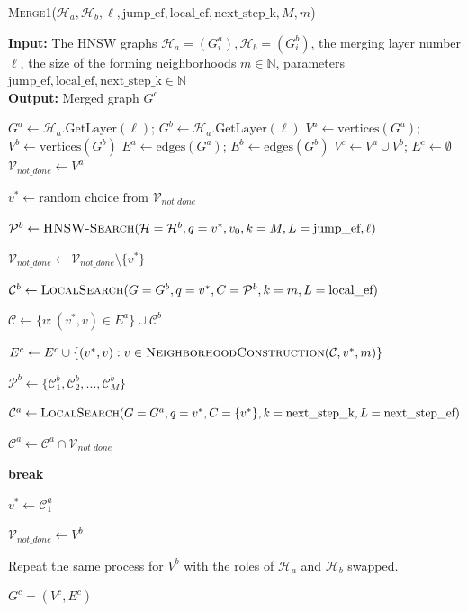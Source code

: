 \documentclass{article}
\begin{document}
\begin{algorithm}
\caption{\textsc{Merge1}($\mathcal{H}_a, \mathcal{H}_b, \ell, \text{jump\_ef}, \text{local\_ef}, \text{next\_step\_k}, M, m$)}\label{alg:merge1}
\textbf{Input:} The HNSW graphs $\mathcal{H}_a = (G^a_i), \mathcal{H}_b = (G^b_i)$, the merging layer number $\ell$, the size of the forming neighborhoods $m \in \mathbb{N}$, parameters $\text{jump\_ef}, \text{local\_ef}, \text{next\_step\_k} \in \mathbb{N}$ \\
\textbf{Output:}  Merged graph $G^c$ 
\begin{algorithmic}[1]
\State $G^a \gets \mathcal{H}_a\text{.GetLayer}(\ell) $; $G^b \gets\mathcal{H}_a\text{.GetLayer}(\ell)$ 
\State $V^a \gets \text{vertices}(G^a)$; $V^b \gets \text{vertices}(G^b)$
\State $E^a \gets \text{edges}(G^a)$; $E^b \gets \text{edges}(G^b)$
\State $V^c \gets V^a \cup V^b$; $E^c \gets \emptyset$ 
\State $\mathcal{V}_{not\_done} \gets V^a$

    \State $v^* \gets \text{random choice from } \mathcal{V}_{not\_done}$
    
    \State $\mathcal{P}^b  \gets \textsc{HNSW-Search}(\mathcal{H}=\mathcal{H}^b, q=v^*, v_0, k=M, L=\text{jump\_ef}, \ell)$
    
        \State $\mathcal{V}_{not\_done} \gets \mathcal{V}_{not\_done} \setminus \{v^*\}$
        
        \State $\mathcal{C}^b  \gets \textsc{LocalSearch}(G=G^b, q=v^*, C=\mathcal{P}^b , k=m, L=\text{local\_ef})$
        
        \State $\mathcal{C} \gets  \{v : (v^*, v) \in E^a \} \cup \mathcal{C}^b$
        
        \State $E^c \gets E^c \cup  \{ (v^*, v)  : v \in \textsc{NeighborhoodConstruction}(\mathcal{C}, v^*, m) \}$

        \State $\mathcal{P}^b \gets \{\mathcal{C}^b_1, \mathcal{C}^b_2, ..., \mathcal{C}^b_M \} $

        \State $\mathcal{C}^a  \gets \textsc{LocalSearch}(G=G^a, q=v^*, C=\{v^*\} , k=\text{next\_step\_k}, L=\text{next\_step\_ef})$
        
        \State $\mathcal{C}^a \gets \mathcal{C}^a \cap \mathcal{V}_{not\_done}$
        
            \State \textbf{break}
        \EndIf
        
        \State $v^* \gets \mathcal{C}^a_1$
    \EndWhile
\EndWhile

\State $\mathcal{V}_{not\_done} \gets V^b$

    \State Repeat the same process for $V^b$ with the roles of $\mathcal{H}_a$ and $\mathcal{H}_b$ swapped.
\EndWhile

\State \Return $G^c=(V^c,E^c)$

\end{algorithmic}
\end{algorithm}
\end{document}
